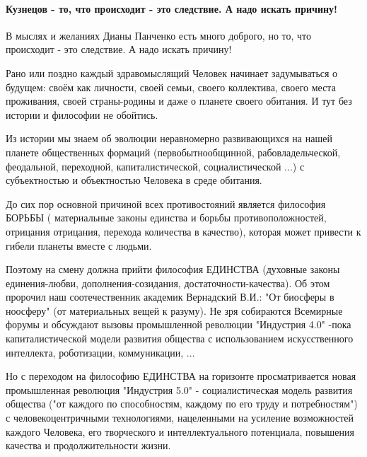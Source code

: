  
 
 
 
 
\paragraph{Кузнецов - то, что происходит - это следствие. А надо искать причину!}

\begin{itemize}


В мыслях и желаниях Дианы Панченко есть много доброго, но то, что происходит -
это следствие. А надо искать причину! 

Рано или поздно каждый здравомыслящий Человек начинает задумываться о будущем:
своём как личности, своей семьи, своего коллектива, своего места проживания,
своей страны-родины и даже о планете своего обитания. И тут без истории и
философии не обойтись. 

Из истории мы знаем об эволюции неравномерно развивающихся на нашей планете
общественных формаций (первобытнообщинной, рабовладельческой, феодальной,
переходной, капиталистической, социалистической ...) с субъектностью и
объектностью Человека в среде обитания. 

До сих пор основной причиной всех противостояний является философия БОРЬБЫ (
материальные законы единства и борьбы противоположностей, отрицания отрицания,
перехода количества в качество), которая может привести к гибели планеты вместе
с людьми. 

Поэтому на смену должна прийти философия ЕДИНСТВА (духовные законы
единения-любви, дополнения-созидания, достаточности-качества). Об этом пророчил
наш соотечественник академик Вернадский В.И.: "От биосферы в ноосферу" (от
материальных вещей к разуму). Не зря собираются Всемирные форумы и обсуждают
вызовы промышленной революции "Индустрия 4.0" -пока капиталистической модели
развития общества с использованием искусственного интеллекта, роботизации,
коммуникации, ... 

Но с переходом на философию ЕДИНСТВА на горизонте просматривается новая
промышленная революция "Индустрия 5.0" - социалистическая модель развития
общества ("от каждого по способностям, каждому по его труду и потребностям") с
человекоцентричными технологиями, нацеленными на усиление возможностей каждого
Человека, его творческого и интеллектуального потенциала, повышения качества и
продолжительности жизни. 


\end{itemize}
